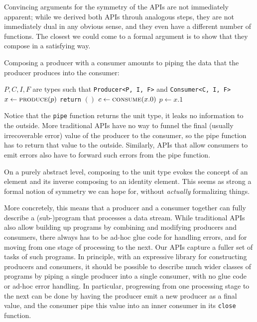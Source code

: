 \documentclass[sigplan,screen,10pt,anonymous,review]{acmart}
\begin{document}
Convincing arguments for the symmetry of the APIs are not immediately apparent; while we derived both APIs throuh analogous steps, they are not immediately dual in any obvious sense, and they even have a different number of functions. The closest we could come to a formal argument is to show that they compose in a satisfying way.

Composing a producer with a consumer amounts to piping the data that the producer produces into the consumer:

\begin{algorithmic}
\Require $P, C, I, F$ are types such that \texttt{Producer<P, I, F>} and \texttt{Consumer<C, I, F>}
    \Loop
        \State $x \gets \Call{produce}{p}$
            \State {}
            \State \texttt{return} $()$
        \Else
            \State $c \gets \Call{consume}{x.0}$
            \State $p \gets x.1$
        \EndIf
    \EndLoop
\EndProcedure
\end{algorithmic}

Notice that the \texttt{pipe} function returns the unit type, it leaks no information to the outside. More traditional APIs have no way to funnel the final (usually irrecoverable error) value of the producer to the consumer, so the pipe function has to return that value to the outside. Similarly, APIs that allow consumers to emit errors also have to forward such errors from the pipe function.

On a purely abstract level, composing to the unit type evokes the concept of an element and its inverse composing to an identity element. This seems as strong a formal notion of symmetry we can hope for, without \textit{actually} formalizing things.

More concretely, this means that a producer and a consumer together can fully describe a (sub-)program that processes a data stream. While traditional APIs also allow building up programs by combining and modifying producers and consumers, there always has to be ad-hoc glue code for handling errors, and for moving from one stage of processing to the next. Our APIs capture a fuller set of tasks of such programs. In principle, with an expressive library for constructing producers and consumers, it should be possible to describe much wider classes of programs by piping a single producer into a single consumer, with no glue code or ad-hoc error handling. In particular, progressing from one processing stage to the next can be done by having the producer emit a new producer as a final value, and the consumer pipe this value into an inner consumer in its \texttt{close} function.
\end{document}
